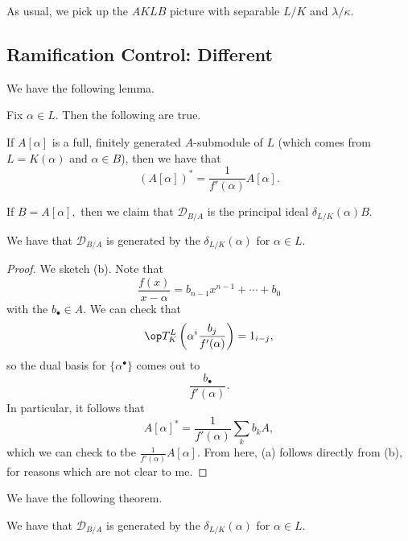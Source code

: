 

















As usual, we pick up the $AKLB$ picture with separable $L/K$ and $\lambda/\kappa.$

\subsection{Ramification Control: Different}
We have the following lemma.
\begin{lemma}
	Fix $\alpha\in L.$ Then the following are true.
	\begin{listalph}
		\item If $A[\alpha]$ is a full, finitely generated $A$-submodule of $L$ (which comes from $L=K(\alpha)$ and $\alpha\in B$), then we have that
		\[(A[\alpha])^*=\frac1{f'(\alpha)}A[\alpha].\]
		\item If $B=A[\alpha],$ then we claim that $\mathcal D_{B/A}$ is the principal ideal $\delta_{L/K}(\alpha)B.$
	\end{listalph}
	We have that $\mathcal D_{B/A}$ is generated by the $\delta_{L/K}(\alpha)$ for $\alpha\in L.$
\end{lemma}
\begin{proof}
	We sketch (b). Note that
	\[\frac{f(x)}{x-\alpha}=b_{n-1}x^{n-1}+\cdots+b_0\]
	with the $b_\bullet\in A.$ We can check that
	\[\op T^L_K\left(\alpha^i\frac{b_j}{f'(\alpha)}\right)=1_{i-j},\]
	so the dual basis for $\{\alpha^\bullet\}$ comes out to
	\[\frac{b_\bullet}{f'(\alpha)}.\]
	In particular, it follows that
	\[A[\alpha]^*=\frac1{f'(\alpha)}\sum_kb_kA,\]
	which we can check to tbe $\frac1{f'(\alpha)}A[\alpha].$ From here, (a) follows directly from (b), for reasons which are not clear to me.
\end{proof}
We have the following theorem.
\begin{theorem}
	We have that $\mathcal D_{B/A}$ is generated by the $\delta_{L/K}(\alpha)$ for $\alpha\in L.$
\end{theorem}
